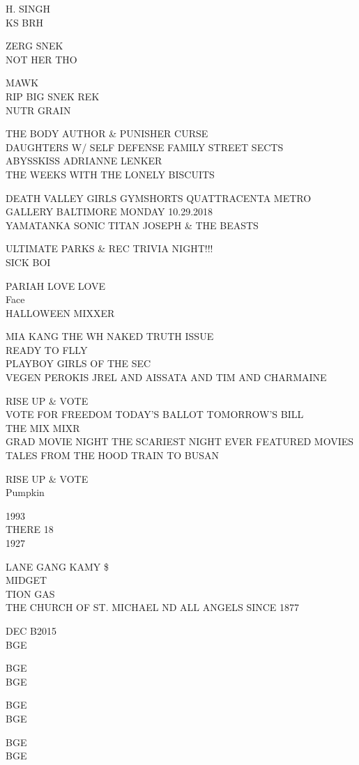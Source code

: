 \documentclass[10pt,letterpaper]{article}
\begin{document}
H. SINGH\\
KS BRH

ZERG SNEK\\
NOT HER THO

MAWK\\
RIP BIG SNEK REK\\
NUTR GRAIN

THE BODY AUTHOR \& PUNISHER CURSE\\
DAUGHTERS W/ SELF DEFENSE FAMILY STREET SECTS\\
ABYSSKISS ADRIANNE LENKER\\
THE WEEKS WITH THE LONELY BISCUITS

DEATH VALLEY GIRLS GYMSHORTS QUATTRACENTA METRO GALLERY BALTIMORE MONDAY 10.29.2018\\
YAMATANKA SONIC TITAN JOSEPH \& THE BEASTS

ULTIMATE PARKS \& REC TRIVIA NIGHT!!!\\
SICK BOI

PARIAH LOVE LOVE\\
Face\\
HALLOWEEN MIXXER

MIA KANG THE WH NAKED TRUTH ISSUE\\
READY TO FLLY\\
PLAYBOY GIRLS OF THE SEC\\
VEGEN PEROKIS JREL AND AISSATA AND TIM AND CHARMAINE

RISE UP \& VOTE\\
VOTE FOR FREEDOM TODAY'S BALLOT TOMORROW'S BILL\\
THE MIX MIXR\\
GRAD MOVIE NIGHT THE SCARIEST NIGHT EVER FEATURED MOVIES TALES FROM THE HOOD TRAIN TO BUSAN

RISE UP \& VOTE\\
Pumpkin

1993\\
THERE 18\\
1927

LANE GANG KAMY \$\\
MIDGET\\
TION GAS\\
THE CHURCH OF ST. MICHAEL ND ALL ANGELS SINCE 1877

DEC B2015\\
BGE

BGE\\
BGE

BGE\\
BGE

BGE\\
BGE
\end{document}
